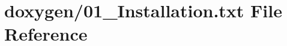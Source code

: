 \hypertarget{01__Installation_8txt}{\section{doxygen/01\+\_\+\+Installation.txt File Reference}
\label{01__Installation_8txt}
}
